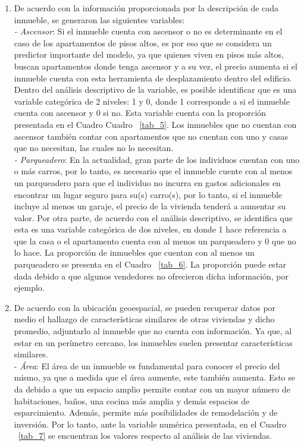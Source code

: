 \documentclass[conference, 10pt]{IEEEtran}
\begin{document}
\begin{enumerate}
 \item De acuerdo con la información proporcionada por la descripción de cada inmueble, se generaron las siguientes variables:\\
\textit{-	Ascensor}: Si el inmueble cuenta con ascensor o no es determinante en el caso de los apartamentos de pisos altos, es por eso que se considera un predictor importante del modelo, ya que quienes viven en pisos más altos, buscan apartamentos donde tenga ascensor y a su vez, el precio aumenta si el inmueble cuenta con esta herramienta de desplazamiento dentro del edificio. Dentro del análisis descriptivo de la variable, es posible identificar que es una variable categórica de 2 niveles: 1 y 0, donde 1 corresponde a si el inmueble cuenta con ascensor y 0 si no. Esta variable cuenta con la proporción presentada en el Cuadro Cuadro ~\ref{tab_5}. Los inmuebles que no cuentan con ascensor también contar con apartamentos que no cuentan con uno y casas que no necesitan, las cuales no lo necesitan.\\
\textit{-	Parqueadero}: En la actualidad, gran parte de los individuos cuentan con uno o más carros, por lo tanto, es necesario que el inmueble cuente con al menos un parqueadero para que el individuo no incurra en gastos adicionales en encontrar un lugar seguro para su(s) carro(s), por lo tanto, si el inmueble incluye al menos un garaje, el precio de la vivienda tenderá a aumentar su valor. Por otra parte, de acuerdo con el análisis descriptivo, se identifica que esta es una variable categórica de dos niveles, en donde 1 hace referencia a que la casa o el apartamento cuenta con al menos un parqueadero y 0 que no lo hace. La proporción de inmuebles que cuentan con al menos un parqueadero se presenta en el Cuadro ~\ref{tab_6}. La proporción puede estar dada debido a que algunos vendedores no ofrecieron dicha información, por ejemplo.
\item De acuerdo con la ubicación geoespacial, se pueden recuperar datos por medio el hallazgo de características similares de otras viviendas y dicho promedio, adjuntarlo al inmueble que no cuenta con información. Ya que, al estar en un perímetro cercano, los inmuebles suelen presentar características similares.\\
-\textit{	Área}: El área de un inmueble es fundamental para conocer el precio del mismo, ya que a medida que el área aumente, este también aumenta. Esto se da debido a que un espacio amplio permite contar con un mayor número de habitaciones, baños, una cocina más amplia y demás espacios de esparcimiento. Además, permite más posibilidades de remodelación y de inversión. Por lo tanto, ante la variable numérica presentada, en el Cuadro ~\ref{tab_7}  se encuentran los valores respecto al análisis de las viviendas.


\end{enumerate}
\end{document}
